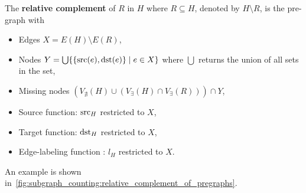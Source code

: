 The \textbf{relative complement} of $R$ in $H$ where $R \subseteq H$, denoted by $H \setminus R$, is the pre-graph with
\begin{itemize}
    \item Edges $X = E(H) \setminus E(R)$,
    \item Nodes $Y =  \bigcup \{\{\operatorname{src}(e), \operatorname{dst}(e)\} \mid e \in X \}$ where $\bigcup$ returns the union of all sets in the set,  
    \item Missing nodes $
   ( V_{\nexists}(H)  \cup
        (
                  V_\exists(H) 
                  \cap 
                  V_\exists(R)
                  )
   )
        \cap  
        Y
                  $,
    \item Source function: ${\operatorname{src}_H}$ restricted to $X$,
    \item Target function: ${\operatorname{dst}_H}$ restricted to $X$,
    \item Edge-labeling function : $l_H$ restricted to $X$.
\end{itemize}
An example is shown in~\autoref{fig:subgraph_counting:relative_complement_of_pregraphs}.
